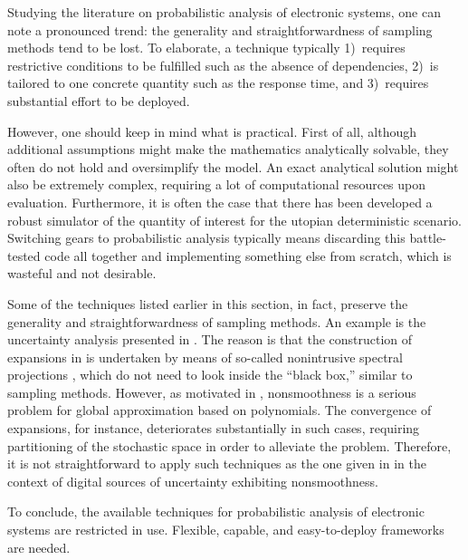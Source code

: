Studying the literature on probabilistic analysis of electronic systems, one can
note a pronounced trend: the generality and straightforwardness of sampling
methods tend to be lost. To elaborate, a technique typically 1)~requires
restrictive conditions to be fulfilled such as the absence of dependencies,
2)~is tailored to one concrete quantity such as the response time, and
3)~requires substantial effort to be deployed.

However, one should keep in mind what is practical. First of all, although
additional assumptions might make the mathematics analytically solvable, they
often do not hold and oversimplify the model. An exact analytical solution might
also be extremely complex, requiring a lot of computational resources upon
evaluation. Furthermore, it is often the case that there has been developed a
robust simulator of the quantity of interest for the utopian deterministic
scenario. Switching gears to probabilistic analysis typically means discarding
this battle-tested code all together and implementing something else from
scratch, which is wasteful and not desirable.

Some of the techniques listed earlier in this section, in fact, preserve the
generality and straightforwardness of sampling methods. An example is the
uncertainty analysis presented in \cite{ukhov2015}. The reason is that the
construction of  expansions in \cite{ukhov2015} is undertaken by means of
so-called nonintrusive spectral projections \cite{xiu2010}, which do not need to
look inside the ``black box,'' similar to sampling methods. However, as
motivated in , nonsmoothness is a serious problem for global
approximation based on polynomials. The convergence of  expansions, for
instance, deteriorates substantially in such cases, requiring partitioning of
the stochastic space in order to alleviate the problem. Therefore, it is not
straightforward to apply such techniques as the one given in \cite{ukhov2015} in
the context of digital sources of uncertainty exhibiting nonsmoothness.

To conclude, the available techniques for probabilistic analysis of electronic
systems are restricted in use. Flexible, capable, and easy-to-deploy frameworks
are needed.
